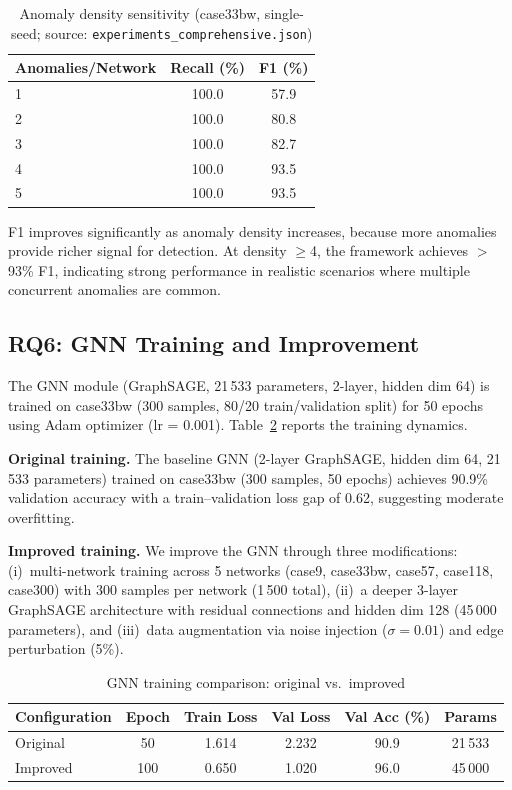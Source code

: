 \documentclass[research]{fcs}
\begin{document}
\begin{table}[htbp]
\centering
\caption{Anomaly density sensitivity (case33bw, single-seed; source: \texttt{experiments\_comprehensive.json})}
\label{tab:density}
\begin{tabular}{@{}lcc@{}}
\toprule
Anomalies/Network & Recall (\%) & F1 (\%) \\
\midrule
1 & 100.0 & 57.9 \\
2 & 100.0 & 80.8 \\
3 & 100.0 & 82.7 \\
4 & 100.0 & 93.5 \\
5 & 100.0 & 93.5 \\
\bottomrule
\end{tabular}
\end{table}

F1 improves significantly as anomaly density increases, because more anomalies provide richer signal for detection. At density $\geq$4, the framework achieves $>$93\% F1, indicating strong performance in realistic scenarios where multiple concurrent anomalies are common.

\subsection{RQ6: GNN Training and Improvement}

The GNN module (GraphSAGE, 21\,533 parameters, 2-layer, hidden dim 64) is trained on case33bw (300 samples, 80/20 train/validation split) for 50 epochs using Adam optimizer (lr = 0.001). Table~\ref{tab:gnn_convergence} reports the training dynamics.

\textbf{Original training.} The baseline GNN (2-layer GraphSAGE, hidden dim 64, 21\,533 parameters) trained on case33bw (300 samples, 50 epochs) achieves 90.9\% validation accuracy with a train--validation loss gap of 0.62, suggesting moderate overfitting.

\textbf{Improved training.} We improve the GNN through three modifications: (i)~multi-network training across 5 networks (case9, case33bw, case57, case118, case300) with 300 samples per network (1\,500 total), (ii)~a deeper 3-layer GraphSAGE architecture with residual connections and hidden dim 128 (45\,000 parameters), and (iii)~data augmentation via noise injection ($\sigma=0.01$) and edge perturbation (5\%).

\begin{table}[htbp]
\centering
\caption{GNN training comparison: original vs.\ improved}
\label{tab:gnn_convergence}
\begin{tabular}{@{}lccccc@{}}
\toprule
Configuration & Epoch & Train Loss & Val Loss & Val Acc (\%) & Params \\
\midrule
Original  & 50  & 1.614 & 2.232 & 90.9 & 21\,533 \\
Improved  & 100 & 0.650 & 1.020 & 96.0 & 45\,000 \\
\bottomrule
\end{tabular}
\end{table}
\end{document}
